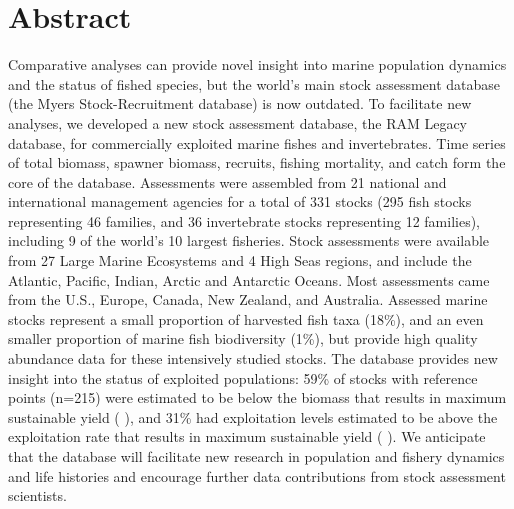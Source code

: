 \section*{Abstract}

Comparative analyses can provide novel insight into marine population dynamics and the status of fished species, but the world's main stock assessment database (the Myers Stock-Recruitment database) is now outdated.  
To facilitate new analyses, we developed a new stock assessment database, the RAM Legacy database, for commercially exploited marine fishes and invertebrates. 
Time series of total biomass, spawner biomass, recruits, fishing mortality, and catch form the core of the database. 
Assessments were assembled from 21 national and international management agencies for a total of 331 stocks (295 fish stocks representing 46 families, and 36 invertebrate stocks representing 12 families), including 9 of the world's 10 largest fisheries. Stock assessments were available from 27 Large Marine Ecosystems and 4 High Seas regions, and include the Atlantic, Pacific, Indian, Arctic and Antarctic Oceans. 
Most assessments came from the U.S., Europe, Canada, New Zealand, and Australia. Assessed marine stocks represent a small proportion of harvested fish taxa (18\%), and an even smaller proportion of marine fish biodiversity (1\%), but provide high quality abundance data for these intensively studied stocks. 
The database provides new insight into the status of exploited populations: 59\% of stocks with reference points (n=215) were estimated to be below the biomass that results in maximum sustainable yield ( ), and 31\% had exploitation levels estimated to be above the exploitation rate that results in maximum sustainable yield ( ).
We anticipate that the database will facilitate new research in population and fishery dynamics and life histories and encourage further data contributions from stock assessment scientists.

